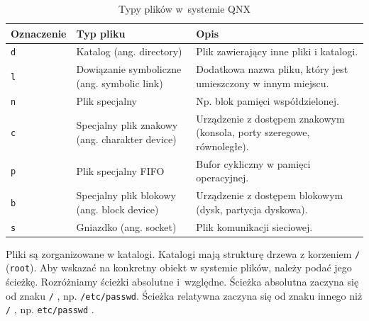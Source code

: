 \begin{table}[h!]
\centering
\caption{Typy plików w~systemie QNX}
\setlength{\arrayrulewidth}{1pt}
\setlength{\tabcolsep}{6pt}
\renewcommand{\arraystretch}{1.2}
\begin{tabular}{ |p{}|p{}|p{}| }
\hline \rowcolor{gray}
\textbf{Oznaczenie} & \textbf{Typ pliku} & \textbf{Opis} \\ \hline
\mbox{\lstinline[style=MyBashStyle]{d}} & Katalog (ang. directory) & Plik zawierający inne pliki i katalogi. \\ \hline
\mbox{\lstinline[style=MyBashStyle]{l}} & Dowiązanie symboliczne (ang. symbolic link) & Dodatkowa nazwa pliku, który jest umieszczony w innym miejscu. \\ \hline
\mbox{\lstinline[style=MyBashStyle]{n}} & Plik specjalny & Np. blok pamięci współdzielonej. \\ \hline
\mbox{\lstinline[style=MyBashStyle]{c}} & Specjalny plik znakowy (ang. charakter device) & Urządzenie z dostępem znakowym (konsola, porty szeregowe, równoległe). \\ \hline
\mbox{\lstinline[style=MyBashStyle]{p}} & Plik specjalny FIFO & Bufor cykliczny w pamięci operacyjnej. \\ \hline
\mbox{\lstinline[style=MyBashStyle]{b}} & Specjalny plik blokowy (ang. block device) & Urządzenie z dostępem blokowym (dysk, partycja dyskowa). \\ \hline
\mbox{\lstinline[style=MyBashStyle]{s}} & Gniazdko (ang. socket)	 & Plik komunikacji sieciowej. \\ \hline
\end{tabular}
\label{tab:typyplikow}
\end{table}


Pliki są zorganizowane w katalogi. Katalogi mają strukturę drzewa z korzeniem \lstinline[style=MyBashStyle]{/} (\lstinline[style=MyBashStyle]{root}). Aby wskazać na konkretny obiekt w systemie plików, należy podać jego ścieżkę. Rozróżniamy ścieżki absolutne i~względne. Ścieżka absolutna zaczyna się od znaku \lstinline[style=MyBashStyle]{/} , np. \lstinline[style=MyBashStyle]{/etc/passwd}. Ścieżka relatywna zaczyna się od znaku innego niż \lstinline[style=MyBashStyle]{/} , np. \lstinline[style=MyBashStyle]{etc/passwd} .


